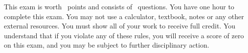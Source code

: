 \documentclass[addpoints,12pt]{exam}
\title{}
\author{[COURSE TITLE HERE]}
\begin{document}
\NameSection

{\let\newpage\relax\maketitle}

This exam is worth \numpoints\ points and consists of \numquestions\ questions.
You have one hour to complete this exam.
You may not use a calculator, textbook, notes or any other external resources.
You must show all of your work to receive full credit.
You understand that if you violate any of these rules, you will receive a score of zero on this exam, and you may be subject to further disciplinary action.

\begin{center}
  \pointtable[v][questions]
\end{center}

\newpage

\begin{questions}

\end{questions}
\end{document}

